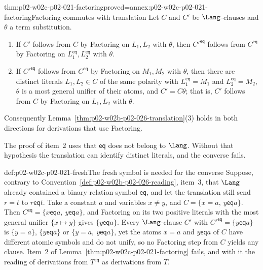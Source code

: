\begin{hblemma}{thm:p02-w02c-p02-021-factoring}{proved=annex:p02-w02c-p02-021-factoring}{Factoring commutes with translation}
Let \(C\) and \(C'\) be \(\Lang\)-clauses and \(\theta\) a term substitution.
\begin{enumerate}
  \item If \(C'\) follows from \(C\) by Factoring on \(L_1,L_2\) with
        \(\theta\), then \(C'^{\mathsf{eq}}\) follows from \(C^{\mathsf{eq}}\)
        by Factoring on \(L_1^{\mathsf{eq}},L_2^{\mathsf{eq}}\) with
        \(\theta\).
  \item If \(C'^{\mathsf{eq}}\) follows from \(C^{\mathsf{eq}}\) by Factoring
        on \(M_1,M_2\) with \(\theta\), then there are distinct literals
        \(L_1,L_2\in C\) of the same polarity with
        \(L_1^{\mathsf{eq}}=M_1\) and \(L_2^{\mathsf{eq}}=M_2\), \(\theta\) is
        a most general unifier of their atoms, and \(C'=C\theta\); that is,
        \(C'\) follows from \(C\) by Factoring on \(L_1,L_2\) with \(\theta\).
\end{enumerate}
Consequently Lemma~\ref{thm:p02-w02b-p02-026-translation}(3) holds in both
directions for derivations that use Factoring.
\end{hblemma}

The proof of item~2 uses that \(\mathsf{eq}\) does not belong to \(\Lang\).
Without that hypothesis the translation can identify distinct literals, and
the converse fails.

\begin{hbwarning}{def:p02-w02c-p02-021-fresh}{The fresh symbol is needed for the converse}
Suppose, contrary to Convention~\ref{def:p02-w02b-p02-026-reading}, item~3,
that \(\Lang\) already contained a binary relation symbol \(\mathsf{eq}\), and
let the translation still send \(r=t\) to \(r\mathrel{\mathsf{eq}}t\).  Take a
constant \(a\) and variables \(x\neq y\), and
\(C=\{x=a,\ y\mathrel{\mathsf{eq}}a\}\).  Then
\(C^{\mathsf{eq}}=\{x\mathrel{\mathsf{eq}}a,\ y\mathrel{\mathsf{eq}}a\}\), and
Factoring on its two positive literals with the most general unifier
\(\{x\mapsto y\}\) gives \(\{y\mathrel{\mathsf{eq}}a\}\).  Every
\(\Lang\)-clause \(C'\) with \(C'^{\mathsf{eq}}=\{y\mathrel{\mathsf{eq}}a\}\)
is \(\{y=a\}\), \(\{y\mathrel{\mathsf{eq}}a\}\) or
\(\{y=a,\ y\mathrel{\mathsf{eq}}a\}\), yet the atoms \(x=a\) and
\(y\mathrel{\mathsf{eq}}a\) of \(C\) have different atomic symbols and do not
unify, so no Factoring step from \(C\) yields any clause.  Item~2 of
Lemma~\ref{thm:p02-w02c-p02-021-factoring} fails, and with it the reading of
derivations from \(T^{\mathsf{eq}}\) as derivations from \(T\).
\end{hbwarning}


